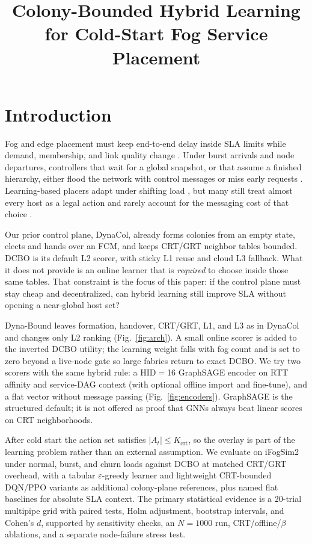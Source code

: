 \documentclass[pdflatex,sn-mathphys-num,iicol]{sn-jnl}
\title{Colony-Bounded Hybrid Learning for Cold-Start Fog Service Placement}
\author*[1]{\fnm{Rouhollah}\sur{Nabati}}
\author[2]{\fnm{Abdulbaghi}\sur{Ghaderzadeh}}
\affil[1]{\orgdiv{Department of Computer Engineering}, \orgname{Islamic Azad University, Sanandaj Branch}, \city{Sanandaj}, \country{Iran}\par\texttt{rnabati@gmail.com}}
\affil[2]{\orgdiv{Department of Computer Engineering}, \orgname{Islamic Azad University, Sanandaj Branch}, \city{Sanandaj}, \country{Iran}\par\texttt{b.ghaderzadeh80@gmail.com}}
\begin{document}
\maketitle

\section{Introduction}
\label{sec:intro}

Fog and edge placement must keep end-to-end delay inside SLA limits while demand,
membership, and link quality change
\cite{bonomi_mcc2012,chiang_jiot2016,yousefpour_sysarc2019,mouradian_comst2018}.
Under burst arrivals and node departures, controllers that wait for a global
snapshot, or that assume a finished hierarchy, either flood the network with
control messages or miss early requests
\cite{salaht_csur2020,taleb_csur2025_survey,gasmi_jsup2021_survey}.
Learning-based placers adapt under shifting load
\cite{supraja_cluster2025_slr,schulman_ppo2017,haddadha_aire2024_mlplacement},
but many still treat almost every host as a legal action and rarely account for
the messaging cost of that choice
\cite{hong_csur2019_resource,abdulazeez_access2023_offload}.

Our prior control plane, DynaCol, already forms colonies from an empty state,
elects and hands over an FCM, and keeps CRT/GRT neighbor tables bounded. DCBO is
its default L2 scorer, with sticky L1 reuse and cloud L3 fallback. What it does
not provide is an online learner that is \emph{required} to choose inside those
same tables. That constraint is the focus of this paper: if the control plane
must stay cheap and decentralized, can hybrid learning still improve SLA without
opening a near-global host set?

Dyna-Bound leaves formation, handover, CRT/GRT, L1, and L3 as in DynaCol and
changes only L2 ranking (Fig.~\ref{fig:arch}). A small online scorer is added to
the inverted DCBO utility; the learning weight falls with fog count and is set
to zero beyond a live-node gate so large fabrics return to exact DCBO. We try
two scorers with the same hybrid rule: a HID$=$16 GraphSAGE encoder on RTT
affinity and service-DAG context (with optional offline import and fine-tune),
and a flat vector without message passing (Fig.~\ref{fig:encoders}). GraphSAGE is
the structured default; it is not offered as proof that GNNs always beat linear
scores on CRT neighborhoods.

After cold start the action set satisfies $|A_t|\le K_{\mathrm{crt}}$, so the
overlay is part of the learning problem rather than an external assumption.
We evaluate on iFogSim2 under normal, burst, and churn loads against DCBO at
matched CRT/GRT overhead, with a tabular $\varepsilon$-greedy learner and
lightweight CRT-bounded DQN/PPO variants as additional colony-plane references,
plus named flat baselines for absolute SLA context. The primary statistical
evidence is a 20-trial multipipe grid with paired tests, Holm adjustment,
bootstrap intervals, and Cohen's $d$, supported by sensitivity checks, an
$N{=}1000$ run, CRT/offline/$\beta$ ablations, and a separate node-failure stress
test.
\end{document}
